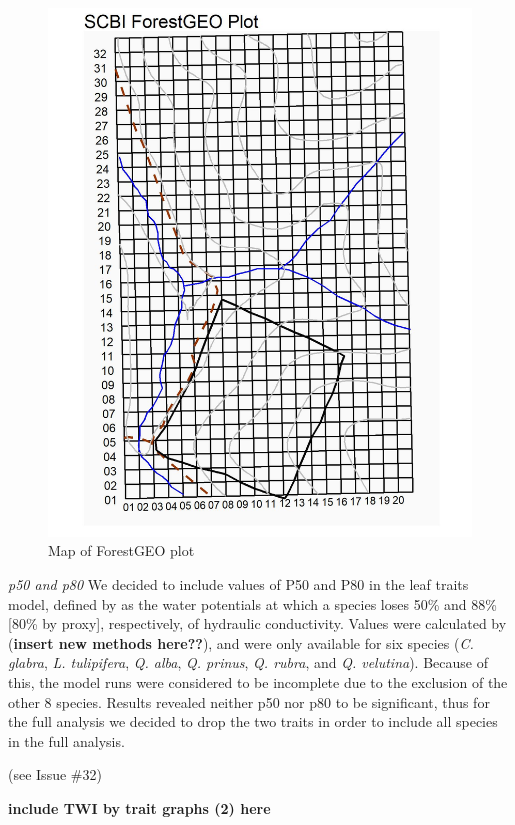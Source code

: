 \documentclass[]{article}
\begin{document}
\begin{figure}[H]
\includegraphics[width=1\linewidth]{tables_figures/ForestGEO_plot} \caption{Map of ForestGEO plot}\label{fig:unnamed-chunk-4}
\end{figure}

\emph{p50 and p80} We decided to include values of P50 and P80 in the
leaf traits model, defined by \citep{anderegg_meta-analysis_2016} as the
water potentials at which a species loses 50\% and 88\% {[}80\% by
proxy{]}, respectively, of hydraulic conductivity. Values were
calculated by (\textbf{insert new methods here??}), and were only
available for six species (\emph{C. glabra}, \emph{L. tulipifera},
\emph{Q. alba}, \emph{Q. prinus}, \emph{Q. rubra}, and \emph{Q.
velutina}). Because of this, the model runs were considered to be
incomplete due to the exclusion of the other 8 species. Results revealed
neither p50 nor p80 to be significant, thus for the full analysis we
decided to drop the two traits in order to include all species in the
full analysis.

(see Issue \#32)

\textbf{include TWI by trait graphs (2) here}


\end{document}
